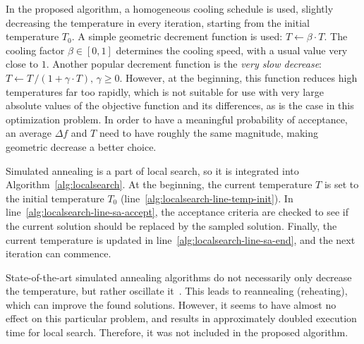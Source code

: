In the proposed algorithm, a homogeneous cooling schedule is used, slightly decreasing the temperature in every iteration, starting from the initial temperature $T_0$.
A simple geometric decrement function is used: $T \gets \beta \cdot T$.
The cooling factor $\beta \in [0, 1]$ determines the cooling speed, with a usual value very close to $1$.
Another popular decrement function is the \textit{very slow decrease}: $T \gets T \, / \left( 1 + \gamma \cdot T \right), \, \gamma \ge 0$.
However, at the beginning, this function reduces high temperatures far too rapidly, which is not suitable for use with very large absolute values of the objective function and its differences, as is the case in this optimization problem.
In order to have a meaningful probability of acceptance, an average $\Delta f$ and $T$ need to have roughly the same magnitude, making geometric decrease a better choice.

Simulated annealing is a part of local search, so it is integrated into Algorithm~\ref{alg:localsearch}.
At the beginning, the current temperature $T$ is set to the initial temperature $T_0$ (line~\ref{alg:localsearch-line-temp-init}).
In line~\ref{alg:localsearch-line-sa-accept}, the acceptance criteria are checked to see if the current solution should be replaced by the sampled solution.
Finally, the current temperature is updated in line~\ref{alg:localsearch-line-sa-end}, and the next iteration can commence.

State-of-the-art simulated annealing algorithms do not necessarily only decrease the temperature, but rather oscillate it~\cite{Misevicius/SA}\cite{Ma/InhomogeneousSA}.
This leads to reannealing (reheating), which can improve the found solutions.
However, it seems to have almost no effect on this particular problem, and results in approximately doubled execution time for local search.
Therefore, it was not included in the proposed algorithm.


\newcommand{\comment}[1]{}
\comment{

-- fig:dfs-graph --
https://dreampuf.github.io/GraphvizOnline
digraph G {
  e11[label=<e<SUB>1</SUB>>];
  e12[label=<e<SUB>1</SUB>>, color="#cc0000"];
  e21[label=<e<SUB>2</SUB>>];
  e22[label=<e<SUB>2</SUB>>];
  e3[label=<e<SUB>3</SUB>>];
  e4[label=<e<SUB>4</SUB>>];
  s -> e11;
  e11 -> e21 -> dots11;
  e11 -> dots1;
  s -> e22;
  e22 -> e12;
  e12 -> dots22 [color="#cc0000"];
  e22 -> e3 -> dots3;
  e22 -> e4 -> dots4;
  e22 -> dots2;
  dots1[label=<...>];
  dots2[label=<...>];
  dots3[label=<...>];
  dots4[label=<...>];
  dots11[label=<...>];
  dots22[label=<...>, color="#cc0000"];
}

}
